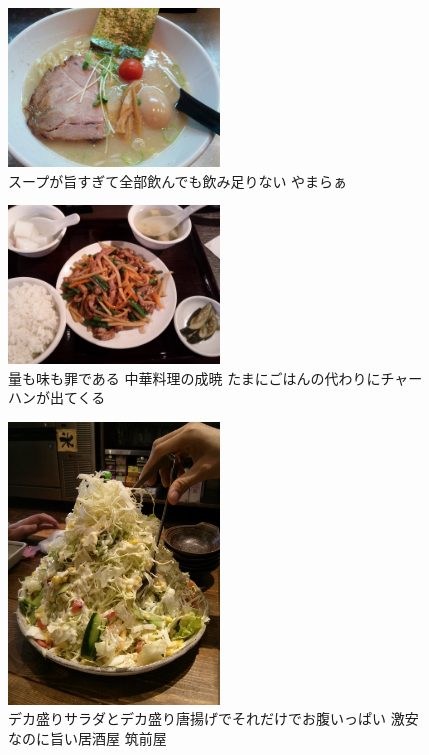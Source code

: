 \begin{figure}[H]
  \centering
  \includegraphics[width=0.5\textwidth]{../images/yamara.jpg}
  \caption{スープが旨すぎて全部飲んでも飲み足りない やまらぁ}
\end{figure}

\begin{figure}[H]
  \centering
  \includegraphics[width=0.5\textwidth]{../images/seigyo.jpg}
  \caption{量も味も罪である 中華料理の成暁 たまにごはんの代わりにチャーハンが出てくる}
\end{figure}

\begin{figure}[H]
  \centering
  \includegraphics[width=0.5\textwidth]{../images/chikuzen.jpg}
  \caption{デカ盛りサラダとデカ盛り唐揚げでそれだけでお腹いっぱい 激安なのに旨い居酒屋 筑前屋}
\end{figure}

